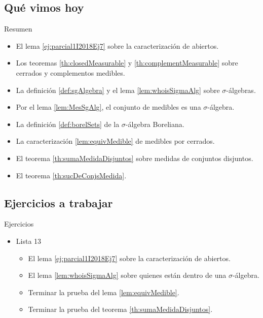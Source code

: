 \documentclass[utf8]{beamer}
\theoremstyle{plain}
\theoremstyle{definition}
\theoremstyle{remark}
\numberwithin{equation}{section}
\newcommand{\sg}{\sigma}                %
\renewcommand{\.}{\Cdot}                %
\begin{document}
\subsection*{Qu\'e vimos hoy}

\begin{frame}{Resumen}

  \begin{itemize}
  \item El lema \ref{ej:parcial1I2018Ej7} sobre la caracterización de abiertos.
  \item Los teoremas \ref{th:closedMeasurable} y \ref{th:complementMeasurable} sobre cerrados y complementos medibles.
  \item La definición \ref{def:sgAlgebra} y el lema \ref{lem:whoisSigmaAlg} sobre $\sg$-álgebras.
  \item Por el lema \ref{lem:MesSgAlg}, el conjunto de medibles es una $\sg$-álgebra.
  \item La definición \ref{def:borelSets} de la $\sg$-álgebra Boreliana.
  \item La caracterización \ref{lem:equivMedible} de medibles por cerrados.
  \item El teorema \ref{th:sumaMedidaDisjuntos} sobre medidas de conjuntos disjuntos.
  \item El teorema \ref{th:sucDeConjsMedida}.
  \end{itemize}
  
\end{frame}

\subsection*{Ejercicios a trabajar}
\begin{frame}{Ejercicios}
    
  \begin{itemize}
    \item
      Lista 13
      \begin{itemize}
      \item El lema \ref{ej:parcial1I2018Ej7} sobre la caracterización de abiertos.
      \item El lema \ref{lem:whoisSigmaAlg} sobre quienes están dentro de una $\sg$-álgebra.
      \item Terminar la prueba del lema \ref{lem:equivMedible}.
      \item Terminar la prueba del teorema \ref{th:sumaMedidaDisjuntos}.
      \end{itemize}
    \end{itemize}
  
\end{frame}
\end{document}
